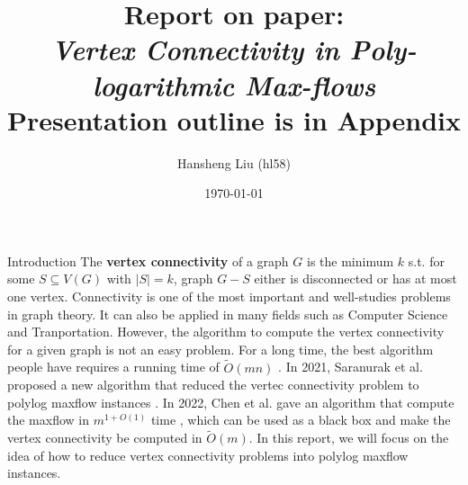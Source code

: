 \documentclass{article}
\newcommand{\psetauthor}[1]{\author{#1}}
\begin{document}
\title{Report on paper:
 \\ \textit{Vertex Connectivity in Poly-logarithmic Max-flows}
 \\ \small{Presentation outline is in Appendix}}
\psetauthor{Hansheng Liu (hl58)}
\date{\today}
\maketitle
\clearpage

\begin{section}{Introduction}
The \textbf{vertex connectivity} of a graph $G$ is the minimum $k$ s.t. for some $S \subseteq V(G)$ with $|S| = k$, graph $G - S$ either is disconnected or has at most one vertex. Connectivity is one of the most important and well-studies problems in graph theory. It can also be applied in many fields such as Computer Science and Tranportation. However, the algorithm to compute the vertex connectivity for a given graph is not an easy problem. For a long time, the best algorithm people have requires a running time of $\tilde{O}(mn)$ \cite{vertex_connectivity_henzinger}. In 2021, Saranurak et al. proposed a new algorithm that reduced the vertec connectivity problem to polylog maxflow instances \cite{vertex_connectivity}. In 2022, Chen et al. gave an algorithm that compute the maxflow in $m^{1 + O(1)}$ time \cite{max_flow_min_cost}, which can be used as a black box and make the vertex connectivity be computed in $\tilde{O}(m)$. In this report, we will focus on the idea of how to reduce vertex connectivity problems into polylog maxflow instances. 
\end{section}
\end{document}
